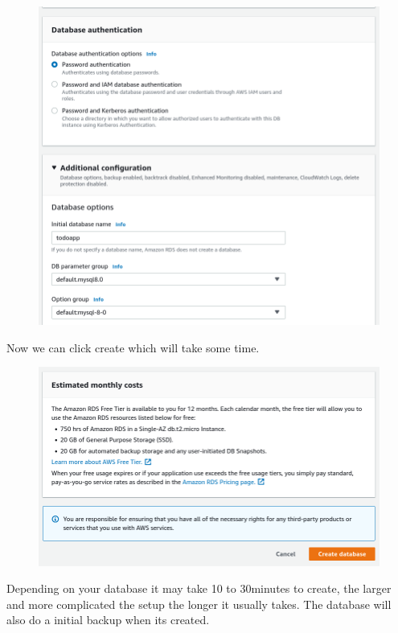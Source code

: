 \documentclass{csse4400}
\begin{document}
\begin{figure}[H]
  \includegraphics[width=\textwidth]{images/db7}
\end{figure}

Now we can click create which will take some time.

\begin{figure}[H]
  \includegraphics[width=\textwidth]{images/db8}
\end{figure}

Depending on your database it may take 10 to 30minutes to create,
the larger and more complicated the setup the longer it usually takes.
The database will also do a initial backup when its created.
\end{document}
